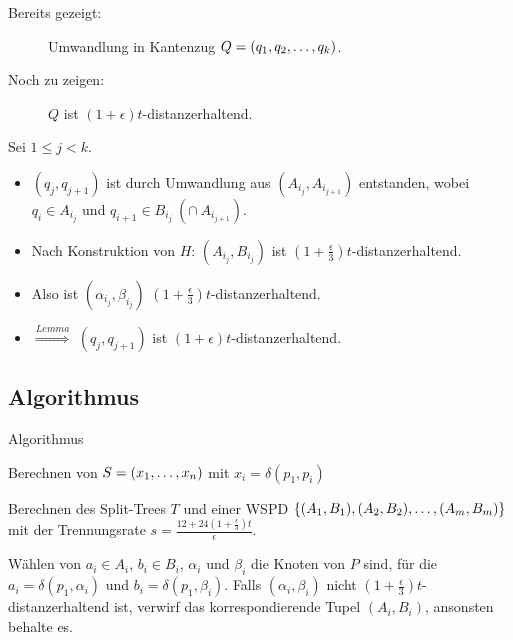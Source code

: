 \documentclass{beamer}
\begin{document}
	\begin{frame}
		\begin{description}
			\item[Bereits gezeigt: ] Umwandlung in Kantenzug $Q = (q_1, q_2, \mathellipsis, q_k)$.
			\item[Noch zu zeigen: ] $Q$ ist $(1 + \epsilon)t$-distanzerhaltend.
		\end{description}
		
		Sei $1 \leq j < k$.
		
		\begin{itemize}
			\item<2-> $(q_j, q_{j+1})$ ist durch Umwandlung aus $(A_{i_j}, A_{i_{j+1}})$ entstanden, wobei $q_i \in A_{i_j}$ und $q_{i+1} \in B_{i_j}\ (\cap\ A_{i_{j+1}})$.
			
			\item<3-> Nach Konstruktion von $H$: $(A_{i_j}, B_{i_j})$ ist $(1 + \frac{\epsilon}{3})t$-distanzerhaltend.
			
			\item<4-> Also ist $(\alpha_{i_j}, \beta_{i_j})$ $(1 + \frac{\epsilon}{3})t$-distanzerhaltend.
			
			\item<5-> $\stackrel{Lemma}{\Rightarrow}$ $(q_j, q_{j+1})$ ist $(1 + \epsilon)t$-distanzerhaltend.
		\end{itemize}
		
	\end{frame}
	
	\subsection{Algorithmus}
	\begin{frame}{Algorithmus}
		\begin{description}
			\item<1->[Schritt 1:] Berechnen von $S = (x_1, \mathellipsis, x_n)$ mit $x_i = \delta(p_1, p_i)$
			\item<2->[Schritt 2:] Berechnen des Split-Trees $T$ und einer WSPD $\{(A_1, B_1), (A_2, B_2), \mathellipsis, (A_m, B_m)\}$ mit der Trennungsrate $s = \frac{12 + 24(1 + \frac{\epsilon}{3})t}{\epsilon}$. 
			\item<3->[Schritt 3:] Wählen von $a_i \in A_i$, $b_i \in B_i$, $\alpha_i$ und  $\beta_i$ die Knoten von $P$ sind, für die $a_i = \delta(p_1, \alpha_i)$ und $b_i = \delta(p_1, \beta_i)$. 
			Falls $(\alpha_i, \beta_i)$ nicht $(1+\frac{\epsilon}{3})t$-distanzerhaltend ist, verwirf das korrespondierende Tupel $(A_i, B_i)$, ansonsten behalte es.
		\end{description}
	\end{frame} 
	
\end{document}
